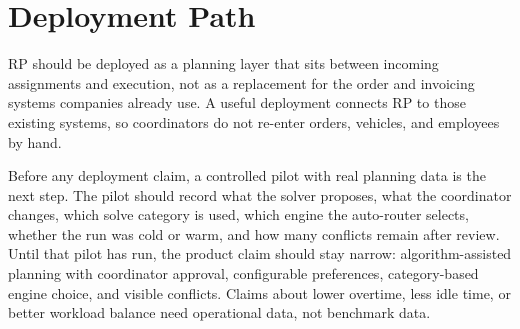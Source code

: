 \section{Deployment Path}
\label{sec:adoption}
\label{sec:recommendations}

RP should be deployed as a planning layer that sits between incoming assignments and execution, not as a replacement for the order and invoicing systems companies already use. A useful deployment connects RP to those existing systems, so coordinators do not re-enter orders, vehicles, and employees by hand.

Before any deployment claim, a controlled pilot with real planning data is the next step. The pilot should record what the solver proposes, what the coordinator changes, which solve category is used, which engine the auto-router selects, whether the run was cold or warm, and how many conflicts remain after review. Until that pilot has run, the product claim should stay narrow: algorithm-assisted planning with coordinator approval, configurable preferences, category-based engine choice, and visible conflicts. Claims about lower overtime, less idle time, or better workload balance need operational data, not benchmark data.
